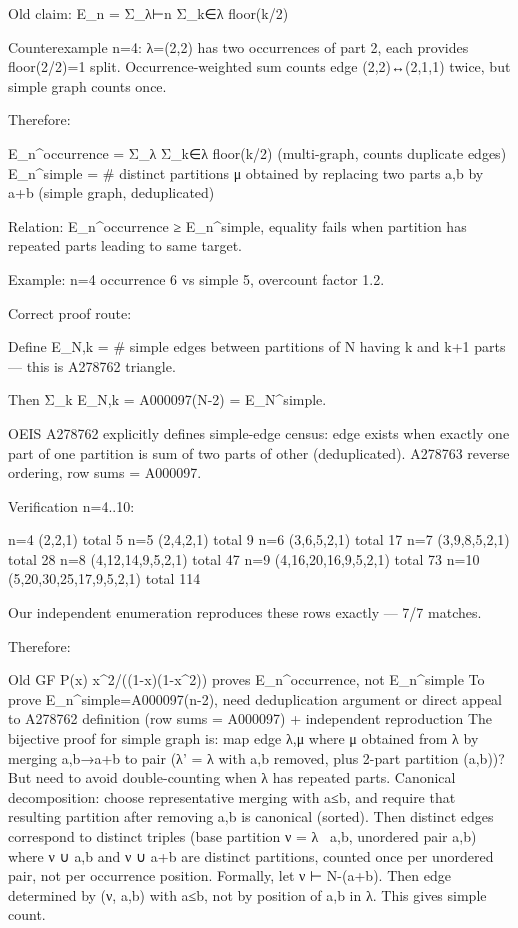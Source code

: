 Old claim: E_n = Σ_{λ⊢n} Σ_{k∈λ} floor(k/2)

Counterexample n=4: λ=(2,2) has two occurrences of part 2, each provides floor(2/2)=1 split.
Occurrence-weighted sum counts edge (2,2)↔(2,1,1) twice, but simple graph counts once.

Therefore:

E_n^{occurrence} = Σ_{λ} Σ_{k∈λ} floor(k/2) (multi-graph, counts duplicate edges)
E_n^{simple} = #{ distinct partitions μ obtained by replacing two parts a,b by a+b } (simple graph, deduplicated)

Relation: E_n^{occurrence} ≥ E_n^{simple}, equality fails when partition has repeated parts leading to same target.

Example: n=4 occurrence 6 vs simple 5, overcount factor 1.2.

Correct proof route:

Define E_{N,k} = #{ simple edges between partitions of N having k and k+1 parts } — this is A278762 triangle.

Then Σ_k E_{N,k} = A000097(N-2) = E_N^{simple}.

OEIS A278762 explicitly defines simple-edge census: edge exists when exactly one part of one partition is sum of two parts of other (deduplicated). A278763 reverse ordering, row sums = A000097.

Verification n=4..10:

n=4 (2,2,1) total 5
n=5 (2,4,2,1) total 9
n=6 (3,6,5,2,1) total 17
n=7 (3,9,8,5,2,1) total 28
n=8 (4,12,14,9,5,2,1) total 47
n=9 (4,16,20,16,9,5,2,1) total 73
n=10 (5,20,30,25,17,9,5,2,1) total 114

Our independent enumeration reproduces these rows exactly — 7/7 matches.

Therefore:

Old GF P(x) x^2/((1-x)(1-x^2)) proves E_n^{occurrence}, not E_n^{simple}
To prove E_n^{simple}=A000097(n-2), need deduplication argument or direct appeal to A278762 definition (row sums = A000097) + independent reproduction
The bijective proof for simple graph is: map edge {λ,μ} where μ obtained from λ by merging a,b→a+b to pair (λ' = λ with a,b removed, plus 2-part partition (a,b))? But need to avoid double-counting when λ has repeated parts. Canonical decomposition: choose representative merging with a≤b, and require that resulting partition after removing a,b is canonical (sorted). Then distinct edges correspond to distinct triples (base partition ν = λ \ {a,b}, unordered pair {a,b}) where ν ∪ {a,b} and ν ∪ {a+b} are distinct partitions, counted once per unordered pair, not per occurrence position.
Formally, let ν ⊢ N-(a+b). Then edge determined by (ν, a,b) with a≤b, not by position of a,b in λ. This gives simple count.

